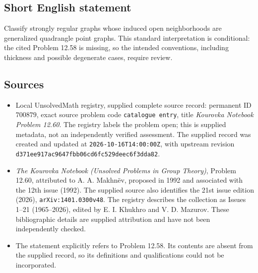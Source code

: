 \documentclass[11pt]{article}
\begin{document}
\subsection{Short English statement}
Classify strongly regular graphs whose induced open neighborhoods are generalized quadrangle point graphs. This standard interpretation is conditional: the cited Problem 12.58 is missing, so the intended conventions, including thickness and possible degenerate cases, require review.
\subsection{Sources}
\begin{itemize}
\item Local UnsolvedMath registry, supplied complete source record: permanent ID \(700879\), exact source problem code \texttt{catalogue entry}, title \emph{Kourovka Notebook Problem 12.60}. The registry labels the problem open; this is supplied metadata, not an independently verified assessment. The supplied record was created and updated at \texttt{2026-10-16T14:00:00Z}, with upstream revision \texttt{d371ee917ac9647fbb06cd6fc529deec6f3dda82}.
\item \emph{The Kourovka Notebook (Unsolved Problems in Group Theory)}, Problem 12.60, attributed to A. A. Makhn\"ev, proposed in 1992 and associated with the 12th issue (1992). The supplied source also identifies the 21st issue edition (2026), \texttt{arXiv:1401.0300v48}. The registry describes the collection as Issues 1--21 (1965--2026), edited by E. I. Khukhro and V. D. Mazurov. These bibliographic details are supplied attribution and have not been independently checked.
\item The statement explicitly refers to Problem 12.58. Its contents are absent from the supplied record, so its definitions and qualifications could not be incorporated.
\end{itemize}
\end{document}

